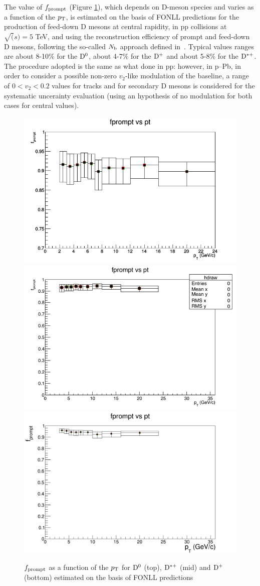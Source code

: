 The value of $f_{\rm prompt}$ (Figure \ref{fprompt}), which depends on D-meson species and varies as a function of the $p_{\rm T}$, is estimated on the basis of FONLL predictions for the production of feed-down D mesons at central rapidity, in pp collisions at $\sqrt(s) = 5$ TeV, and using the reconstruction efficiency of prompt and feed-down D mesons, following the so-called $N_{\rm b}$ approach defined in~\cite{ALICEDmespp7Tev}. Typical values ranges are about 8-10\% for the
${\rm D^0}$, about 4-7\% for the ${\rm D^+}$ and about 5-8\% for the ${\rm D^{*+}}$. The procedure adopted is the same as what done in pp: however, in p--Pb, in order to consider a possible non-zero $v_{2}$-like modulation of the baseline, a range of $0<v_{2}<0.2$ values for tracks and for secondary D mesons is considered for the systematic uncerainty evaluation (using an hypothesis of no modulation for both cases for central values).

\begin{figure}
\centering
\includegraphics[width=0.6\linewidth]{figures/Effs/fprompt_D0.png}
\includegraphics[width=0.6\linewidth]{figures/Effs/fprompt_Dstar.png}
\includegraphics[width=0.6\linewidth]{figures/Effs/fpromptDplus.png}
\caption{$f_{\rm prompt}$ as a function of the $p_{\rm T}$ for ${\rm D^0}$ (top), ${\rm D^{*+}}$ (mid) and ${\rm D^+}$ (bottom) estimated on the basis of FONLL predictions}
\label{fprompt}
\end{figure}

